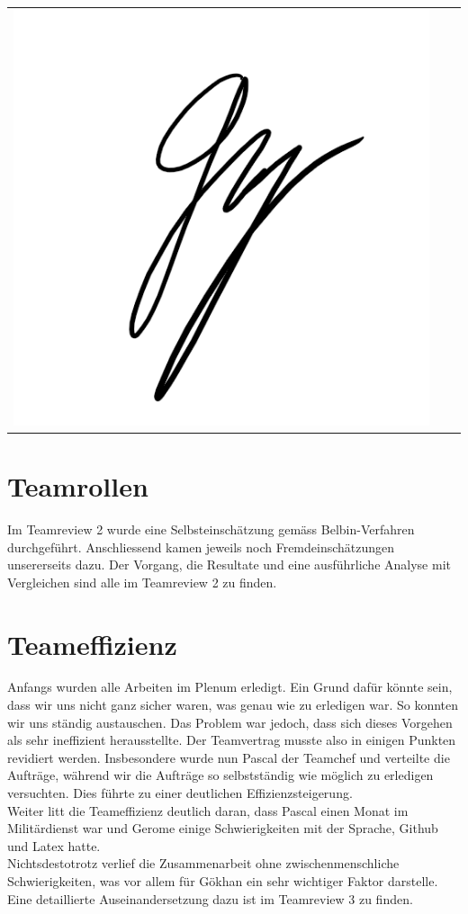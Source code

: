 \begin{tabular}{p{6.5cm}p{6.5cm}p{6.5cm}}
\includegraphics[scale=0.6]{img/unterschriftGoekhan}
\end{tabular}

\section{Teamrollen}

Im Teamreview 2 wurde eine Selbsteinschätzung gemäss Belbin-Verfahren durchgeführt. Anschliessend kamen jeweils noch Fremdeinschätzungen unsererseits dazu. Der Vorgang, die Resultate und eine ausführliche Analyse mit Vergleichen sind alle im Teamreview 2 zu finden. 

\section{Teameffizienz}

Anfangs wurden alle Arbeiten im Plenum erledigt. Ein Grund dafür könnte sein, dass wir uns nicht ganz sicher waren, was genau wie zu erledigen war. So konnten wir uns ständig austauschen. Das Problem war jedoch, dass sich dieses Vorgehen als sehr ineffizient herausstellte. Der Teamvertrag musste also in einigen Punkten revidiert werden. Insbesondere wurde nun Pascal der Teamchef und verteilte die Aufträge, während wir die Aufträge so selbstständig wie möglich zu erledigen versuchten. Dies führte zu einer deutlichen Effizienzsteigerung. \\
Weiter litt die Teameffizienz deutlich daran, dass Pascal einen Monat im Militärdienst war und Gerome einige Schwierigkeiten mit der Sprache, Github und Latex hatte. \\
Nichtsdestotrotz verlief die Zusammenarbeit ohne zwischenmenschliche Schwierigkeiten, was vor allem für Gökhan ein sehr wichtiger Faktor darstelle.  \\
Eine detaillierte Auseinandersetzung dazu ist im Teamreview 3 zu finden.  
